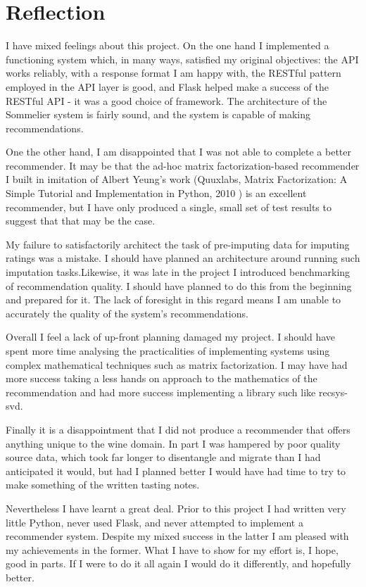 \section{Reflection}\label{review}

I have mixed feelings about this project. On the one hand I implemented a functioning system which, in many ways, satisfied my original objectives: the API works reliably, with a response format I am happy with, the RESTful pattern employed in the API layer is good, and Flask helped make a success of the RESTful API - it was a good choice of framework. The architecture of the Sommelier system is fairly sound, and the system is capable of making recommendations.

One the other hand, I am disappointed that I was not able to complete a better recommender. It may be that the ad-hoc matrix factorization-based recommender I built in imitation of Albert Yeung's work (Quuxlabs, Matrix Factorization: A Simple Tutorial and Implementation in Python, 2010 \cite{Yeung10}) is an excellent recommender, but I have only produced a single, small set of test results to suggest that that may be the case.

My failure to satisfactorily architect the task of pre-imputing data for imputing ratings was a mistake. I should have planned an architecture around running such imputation tasks.Likewise, it was late in the project I introduced benchmarking of recommendation quality. I should have planned to do this from the beginning and prepared for it. The lack of foresight in this regard means I am unable to accurately the quality of the system's recommendations.

Overall I feel a lack of up-front planning damaged my project. I should have spent more time analysing the practicalities of implementing systems using complex mathematical techniques such as matrix factorization. I may have had more success taking a less hands on approach to the mathematics of the recommendation and had more success implementing a library such like recsys-svd.

Finally it is a disappointment that I did not produce a recommender that offers anything unique to the wine domain. In part I was hampered by poor quality source data, which took far longer to disentangle and migrate than I had anticipated it would, but had I planned better I would have had time to try to make something of the written tasting notes.

Nevertheless I have learnt a great deal. Prior to this project I had written very little Python, never used Flask, and never attempted to implement a recommender system. Despite my mixed success in the latter I am pleased with my achievements in the former. What I have to show for my effort is, I hope, good in parts. If I were to do it all again I would do it differently, and hopefully better.

